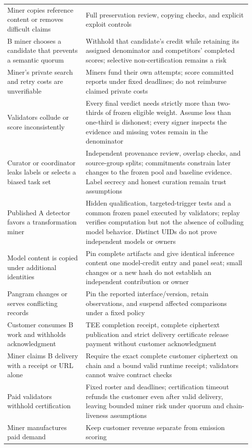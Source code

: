 \begin{longtable}{@{}>{\raggedright\arraybackslash}p{}>{\raggedright\arraybackslash}p{}@{}}
Miner copies reference content or removes difficult claims & Full
preservation review, copying checks, and explicit exploit controls \\
B miner chooses a candidate that prevents a semantic quorum & Withhold
that candidate's credit while retaining its assigned denominator and
competitors' completed scores; selective non-certification remains a risk \\
Miner's private search and retry costs are unverifiable & Miners fund
their own attempts; score committed reports under fixed deadlines;
do not reimburse claimed private costs \\
Validators collude or score inconsistently & Every final verdict needs
strictly more than two-thirds of frozen eligible weight. Assume less
than one-third is dishonest; every signer inspects the evidence and
missing votes remain in the denominator \\
Curator or coordinator leaks labels or selects a biased task set &
Independent provenance review, overlap checks, and source-group splits;
commitments constrain later changes to the frozen pool and baseline
evidence. Label secrecy and honest curation remain trust assumptions \\
Published A detector favors a transformation miner & Hidden qualification,
targeted-trigger tests and a common frozen panel executed by validators;
replay verifies computation but not the absence of colluding model behavior.
Distinct UIDs do not prove independent models or owners \\
Model content is copied under additional identities & Pin complete artifacts
and give identical inference content one model-credit entry and panel
seat; small changes or a new hash do not establish an independent
contribution or owner \\
Pangram changes or serves conflicting records & Pin the reported
interface/version, retain observations, and suspend affected comparisons
under a fixed policy \\
Customer consumes B work and withholds acknowledgment & TEE completion
receipt, complete ciphertext publication and strict delivery certificate
release payment without customer acknowledgment \\
Miner claims B delivery with a receipt or URL alone & Require the exact
complete customer ciphertext on chain and a bound valid runtime receipt;
validators cannot waive contract checks \\
Paid validators withhold certification & Fixed roster and deadlines;
certification timeout refunds the customer even after valid delivery,
leaving bounded miner risk under quorum and chain-liveness assumptions \\
Miner manufactures paid demand & Keep customer revenue separate from
emission scoring \\
\end{longtable}

